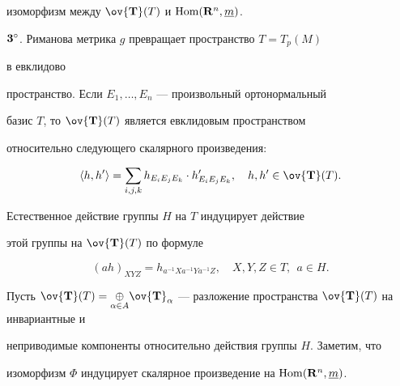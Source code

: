 изоморфизм между $\ov{\bold T}(T)$ и $\operatorname{Hom}(\bold R^n,\underline m)$. 


\medskip 


 


$\bold 3^\circ$. Риманова метрика $g$ превращает пространство $T=T_p(M)$ 


в евклидово 


пространство. Если $E_1,\dotsc,E_n$ --- произвольный ортонормальный 


базис $T$, то $\ov{\bold T}(T)$ является евклидовым пространством 


относительно следующего скалярного произведения: 


$$ 


\la h,h'\ra=\sum_{i,j,k}h_{E_i E_j E_k}\cdot 


h'_{E_i E_j E_k},\quad h,h'\in\ov{\bold T}(T). 


$$ 


Естественное действие группы $H$ на $T$ индуцирует действие


этой группы на $\ov{\bold T}(T)$ по формуле 


$$ 


(a h)_{X Y Z}=h_{a^{-1}X a^{-1}Y a^{-1}Z},\quad 


X,Y,Z\in T,\ \ a\in H. 


$$ 


 


Пусть $\ov{\bold T}(T)=\underset{\alpha\in A}{\oplus}{}\ov{\bold 


T}_\alpha$ --- разложение пространства $\ov{\bold T}(T)$ на инвариантные и 


неприводимые компоненты относительно действия группы $H$. Заметим, что 


изоморфизм $\Phi$ индуцирует скалярное произведение на $\Hom(\bold R^n,\ul 


m)$. 


 


